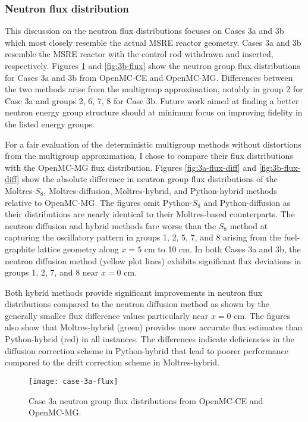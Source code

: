 \subsubsection{Neutron flux distribution}

This discussion on the neutron flux distributions focuses on Cases 3a and 3b which most closely
resemble the actual \gls{MSRE} reactor geometry. Cases 3a and 3b resemble the \gls{MSRE} reactor
with the control rod withdrawn and inserted, respectively. Figures \ref{fig:3a-flux} and
\ref{fig:3b-flux} show the neutron group flux distributions for Cases 3a and 3b from OpenMC-CE and
OpenMC-MG. Differences between the two methods arise from the multigroup approximation, notably in
group 2 for Case 3a and groups 2, 6, 7, 8 for Case 3b. Future work aimed at finding a better
neutron energy group structure should at minimum focus on improving fidelity in the listed energy
groups.

For a fair evaluation of the deterministic multigroup methods without distortions from the
multigroup approximation, I chose to compare their flux distributions with the OpenMC-MG flux
distribution. Figures \ref{fig:3a-flux-diff} and \ref{fig:3b-flux-diff} show the absolute
difference in neutron group flux distributions of the Moltres-$S_8$, Moltres-diffusion,
Moltres-hybrid, and Python-hybrid methods relative to OpenMC-MG. The figures omit Python-$S_8$ and
Python-diffusion as their distributions are nearly identical to their Moltres-based counterparts.
The neutron diffusion and hybrid methods fare worse than the $S_8$ method at capturing the
oscillatory pattern in groups 1, 2, 5, 7, and 8 arising from the fuel-graphite lattice geometry
along $x=5$ cm to 10 cm. In both Cases 3a and 3b, the neutron diffusion method (yellow plot lines)
exhibits significant flux deviations in groups 1, 2, 7, and 8 near $x=0$ cm.

Both hybrid methods
provide significant improvements in neutron flux distributions compared to the neutron diffusion
method as shown by the generally smaller flux difference values particularly near $x=0$ cm. The
figures also show that Moltres-hybrid (green) provides more accurate flux estimates than
Python-hybrid (red) in all instances. The differences indicate deficiencies in the diffusion
correction scheme in Python-hybrid that lead to poorer performance compared to the drift
correction scheme in Moltres-hybrid.

\begin{figure}[htb!]
  \centering
  \texttt{[image: case-3a-flux]}
  \caption{Case 3a neutron group flux distributions from OpenMC-CE and OpenMC-MG.}
  \label{fig:3a-flux}
\end{figure}

